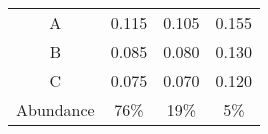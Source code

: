 \begin{tabular}{cccc}
   \hline
A & 0.115 & 0.105 & 0.155 \\ 
  B & 0.085 & 0.080 & 0.130 \\ 
  C & 0.075 & 0.070 & 0.120 \\ 
  Abundance & 76\% & 19\% & 5\% \\ 
   \hline
\end{tabular}
